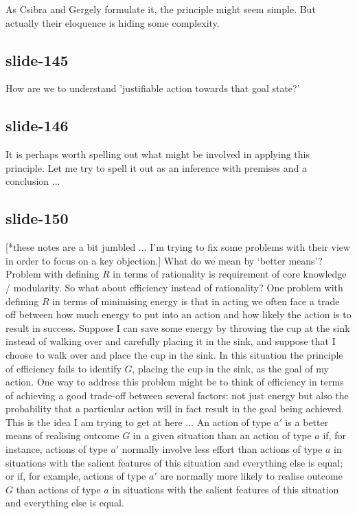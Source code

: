 \documentclass[12pt,\papersize]{extarticle}
\begin{document}
As Csibra and Gergely formulate it, the principle might seem simple.
But actually their eloquence is hiding some complexity.
 
 
\subsection{slide-145}
How are we to understand 'justifiable action towards that goal state?'
 
 
\subsection{slide-146}
It is perhaps worth spelling out what might be involved in applying this principle.
Let me try to spell it out as an inference with premises and a conclusion ...
 
 
\subsection{slide-150}
[*these notes are a bit jumbled ... I'm trying to fix some problems with their view in order to focus on a key objection.]
What do we mean by `better means'? Problem with defining $R$ in terms of rationality is requirement of core knowledge / modularity. So what about efficiency instead of rationality? One problem with defining $R$ in terms of minimising energy is that in acting we often face a trade off between how much energy to put into an action and how likely the action is to result in success.
Suppose I can save some energy by throwing the cup at the sink instead of walking over and carefully placing it in the sink, and suppose that I choose to walk over and place the cup in the sink. In this situation the principle of efficiency fails to identify $G$, placing the cup in the sink, as the goal of my action.
One way to address this problem might be to think of efficiency in terms of achieving a good trade-off between several factors: not just energy but also the probability that a particular action will in fact result in the goal being achieved. This is the idea I am trying to get at here ...
An action of type $a'$ is a better means of realising outcome $G$ in a given situation than an action of type $a$ if, for instance, actions of type $a'$ normally involve less effort than actions of type $a$
in situations with the salient features of this situation
and everything else is equal;
or if, for example, actions of type $a'$ are normally more likely to realise outcome $G$ than actions of type $a$
in situations with the salient features of this situation
and everything else is equal.
 
\end{document}
